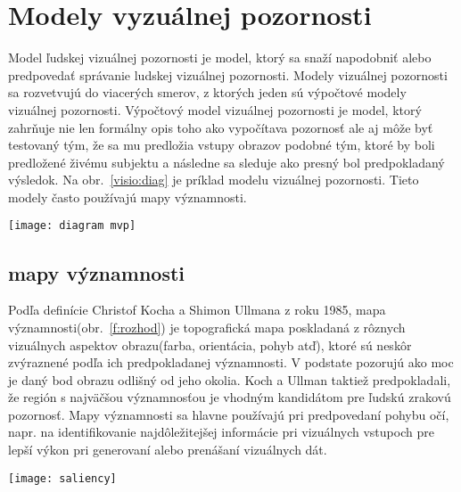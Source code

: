 \documentclass[10pt,twoside,slovak,a4paper]{article}
\begin{document}
\section{Modely vyzuálnej pozornosti} \label{1modely}
Model ľudskej vizuálnej pozornosti je model, ktorý sa snaží napodobniť alebo predpovedať správanie ludskej vizuálnej pozornosti. Modely vizuálnej pozornosti sa rozvetvujú do viacerých smerov, z ktorých jeden sú výpočtové modely vizuálnej pozornosti. Výpočtový model vizuálnej pozornosti je model, ktorý zahrňuje nie len formálny opis toho ako vypočítava pozornosť ale aj môže byť testovaný tým, že sa mu predložia vstupy obrazov podobné tým, ktoré by boli predložené živému subjektu a následne sa sleduje ako presný bol predpokladaný výsledok. Na obr.~\ref{visio:diag} je príklad modelu vizuálnej pozornosti. Tieto modely často používajú mapy významnosti.
\begin{figure*}[tbh]
\centering
\texttt{[image: diagram mvp]}
\caption{príklad modelu vizuálnej pozornosti, ktorý napodobňuje reakciu ľudského zraku na vizuálny podnet}
\label{visio:diag}
\end{figure*}
\subsection{mapy významnosti} \label{ina:nejake}
Podľa definície Christof Kocha a Shimon Ullmana z roku 1985, mapa významnosti(obr.~\ref{f:rozhod}) je topografická mapa poskladaná z rôznych vizuálnych aspektov obrazu(farba, orientácia, pohyb atď), ktoré sú neskôr zvýraznené podľa ich predpokladanej významnosti. V podstate pozorujú ako moc je daný bod obrazu odlišný od jeho okolia. Koch a Ullman taktiež predpokladali, že región s najväčšou významnosťou je vhodným kandidátom pre ľudskú zrakovú pozornosť. Mapy významnosti sa hlavne používajú pri predpovedaní pohybu očí, napr. na identifikovanie najdôležitejšej informácie pri vizuálnych vstupoch pre lepší výkon pri generovaní alebo prenášaní vizuálnych dát.
\begin{figure*}[tbh]
\centering
\texttt{[image: saliency]}
\caption{Príklad mapy významnosti. Napravo je je vizuálny obraz a naľavo je jeho mapa významnosti.}
\label{f:rozhod}
\end{figure*}
\end{document}
